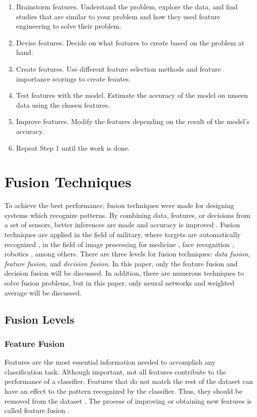 \begin{enumerate}
     \item Brainstorm features. Understand the problem, explore the data, and find studies that are similar to your problem and how they used feature engineering to solve their problem.
     \item Devise features. Decide on what features to create based on the problem at hand.
     \item Create features. Use different feature selection methods and feature importance scorings to create feautes.
     \item Test features with the model. Estimate the accuracy of the model on unseen data using the chosen features.
     \item Improve features. Modify the features depending on the result of the model's accuracy.
     \item Repeat Step 1 until the work is done.
\end{enumerate}





\section{Fusion Techniques}
To achieve the best performance, fusion techniques were made for designing systems which recognize patterns. By combining data, features, or decisions from a set of sensors, better inferences are made and accuracy is improved . Fusion techniques are applied in the field of military, where targets are automatically recognized , in the field of image processing for medicine , face recognition , robotics , among others. There are three levels for fusion techniques: \textit{data fusion, feature fusion, } and \textit{decision fusion}. In this paper, only the feature fusion and decision fusion will be discussed. In addition, there are numerous techniques to solve fusion problems, but in this paper, only neural networks and weighted average will be discussed.

\subsection{Fusion Levels}
\subsubsection{Feature Fusion}
Features are the most essential information needed to accomplish any classification task. Although important, not all features contribute to the performance of a classifier. Features that do not match the rest of the dataset can have an effect to the pattern recognized by the classifier. Thus, they should be removed from the dataset . The process of improving or obtaining new features is called feature fusion . 

